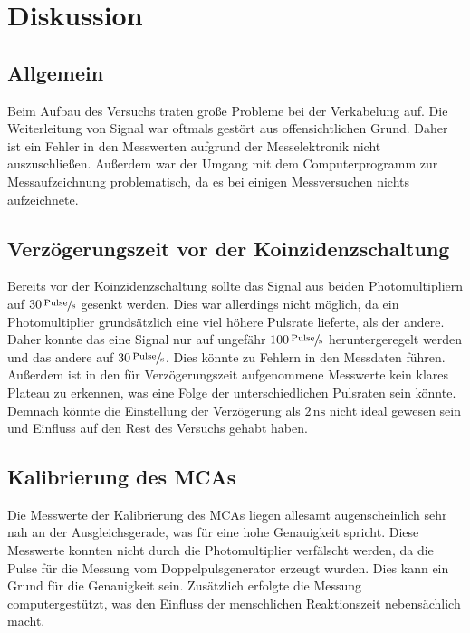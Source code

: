 \section{Diskussion}
\label{sec:Diskussion}
\subsection{Allgemein}
Beim Aufbau des Versuchs traten große Probleme bei der Verkabelung auf. Die Weiterleitung von Signal war oftmals gestört aus 
offensichtlichen Grund. Daher ist ein Fehler in den Messwerten aufgrund der Messelektronik nicht auszuschließen. Außerdem war 
der Umgang mit dem Computerprogramm zur Messaufzeichnung problematisch, da es bei einigen Messversuchen nichts aufzeichnete. 

\subsection{Verzögerungszeit vor der Koinzidenzschaltung}
Bereits vor der Koinzidenzschaltung sollte das Signal aus beiden Photomultipliern auf $30 \,\sfrac{\text{Pulse}}{\unit{\second}}$ gesenkt 
werden. Dies war allerdings nicht möglich, da ein Photomultiplier grundsätzlich eine viel höhere Pulsrate lieferte, als der andere. 
Daher konnte das eine Signal nur auf ungefähr $100 \,\sfrac{\text{Pulse}}{\unit{\second}}$ heruntergeregelt werden und das andere 
auf $30 \,\sfrac{\text{Pulse}}{\unit{\second}}$. Dies könnte zu Fehlern in den Messdaten führen. Außerdem ist in den für 
Verzögerungszeit aufgenommene Messwerte kein klares Plateau zu erkennen, was eine Folge der unterschiedlichen Pulsraten sein könnte. 
Demnach könnte die Einstellung der Verzögerung als $2 \, \unit{\nano\second}$ nicht ideal gewesen sein und Einfluss auf den Rest des 
Versuchs gehabt haben. 

\subsection{Kalibrierung des MCAs}
Die Messwerte der Kalibrierung des MCAs liegen allesamt augenscheinlich sehr nah an der Ausgleichsgerade, was für eine hohe 
Genauigkeit spricht. Diese Messwerte konnten nicht durch die Photomultiplier verfälscht werden, da die Pulse für die Messung 
vom Doppelpulsgenerator erzeugt wurden. Dies kann ein Grund für die Genauigkeit sein. Zusätzlich erfolgte die Messung computergestützt,
was den Einfluss der menschlichen Reaktionszeit nebensächlich macht. 

